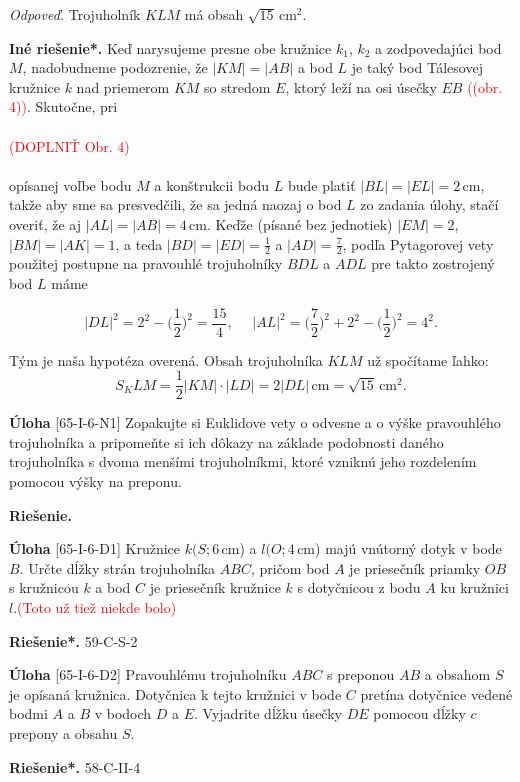 \documentclass{article}
\newcommand{\rie}{\textbf{Riešenie.} }
\newcommand{\rieh}{\textbf{Riešenie*.} }
\newcommand\todo[1]{\noindent\textcolor{red}{(#1)}}
\newcommand{\problem}[3]{
  \begin{tcolorbox}[breakable,notitle,boxrule=0pt,colback=light-gray,colframe=light-gray]
    \textbf{Úloha}
    [#1] #2
  \end{tcolorbox}
  \noindent#3
}
\begin{document}
{\textit{Odpoveď.} Trojuholník $KLM$ má obsah $\sqrt{15}$\,cm$^2$.

\textbf{Iné riešenie*.} Keď narysujeme presne obe kružnice $k_1$, $k_2$ a zodpovedajúci bod $M$, nadobudneme podozrenie, že $|KM| = |AB|$ a bod $L$ je taký bod Tálesovej kružnice $k$ nad priemerom $KM$ so stredom $E$, ktorý leží na osi úsečky $EB$ \todo{(obr. 4)}. Skutočne, pri\\
\\
\todo{DOPLNIŤ Obr. 4}\\
\\
opísanej voľbe bodu $M$ a konštrukcii bodu $L$ bude platiť $|BL| = |EL| = 2$\,cm, takže aby sme sa presvedčili, že sa jedná naozaj o bod $L$ zo zadania úlohy, stačí overiť, že aj $|AL| = |AB| = 4$\,cm. Keďže (písané bez jednotiek) $|EM| = 2$, $|BM| = |AK| = 1$, a teda $|BD| = |ED| =\frac{1}{2}$ a $|AD| =\frac{7}{2}$, podľa Pytagorovej vety použitej postupne na pravouhlé trojuholníky $BDL$ a $ADL$ pre takto zostrojený bod $L$ máme

$$|DL|^2 = 2^2 - \bigg( \frac{1}{2}\bigg)^2=\frac{15}{4}, \ \ \ \ \ \ |AL|^2=\bigg(\frac{7}{2}\bigg)^2+ 2^2 - \bigg(\frac{1}{2}\bigg)^2= 4^2.$$

Tým je naša hypotéza overená. Obsah trojuholníka $KLM$ už spočítame ľahko:
$$S_KLM =\frac{1}{2}|KM| \cdot |LD| = 2|DL|\,\text{cm} =\sqrt{15}\,\text{cm}^2.$$
}



\problem{65-I-6-N1}{
Zopakujte si Euklidove vety o odvesne a o výške pravouhlého trojuholníka a pripomeňte si ich dôkazy na základe podobnosti daného trojuholníka s dvoma menšími trojuholníkmi, ktoré vzniknú jeho rozdelením pomocou výšky na preponu.
}{
\rie 
}


\problem{65-I-6-D1}{
Kružnice $k(S; 6$\,cm) a $l(O; 4$\,cm) majú vnútorný dotyk v bode $B$. Určte dĺžky strán trojuholníka $ABC$, pričom bod $A$ je priesečník priamky $OB$ s kružnicou $k$ a bod $C$ je priesečník kružnice $k$ s dotyčnicou z bodu $A$ ku kružnici $l$.\todo{Toto už tiež niekde bolo}
}{
\rieh 59-C-S-2
}


\problem{65-I-6-D2}{
Pravouhlému trojuholníku $ABC$ s preponou $AB$ a obsahom $S$ je opísaná kružnica. Dotyčnica k tejto kružnici v bode $C$ pretína dotyčnice vedené bodmi $A$ a $B$ v bodoch $D$ a $E$. Vyjadrite dĺžku úsečky $DE$ pomocou dĺžky $c$ prepony a obsahu $S$.
}{
\rieh 58-C-II-4
}
\end{document}
